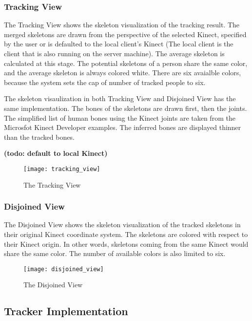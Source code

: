 \subsubsection{Tracking View}
\label{subsec:tracking_view}

The Tracking View shows the skeleton visualization of the tracking result. The merged skeletons are drawn from the perspective of the selected Kinect, specified by the user or is defaulted to the local client's Kinect (The local client is the client that is also running on the server machine). The average skeleton is calculated at this stage. The potential skeletons of a person share the same color, and the average skeleton is always colored white. There are six avaialble colors, because the system sets the cap of number of tracked people to six.

The skeleton visaulization in both Tracking View and Disjoined View has the same implementation. The bones of the skeletons are drawn first, then the joints. The simplified list of human bones using the Kinect joints are taken from the Microsfot Kinect Developer examples. The inferred bones are displayed thinner than the tracked bones.

\textbf{(todo: default to local Kinect)}

\begin{figure}[h!]
  \centering
  \texttt{[image: tracking\_view]}
  \caption{The Tracking View}
  \label{fig:tracking_view}
\end{figure}

\subsubsection{Disjoined View}
\label{subsec:disjoined_view}

The Disjoined View shows the skeleton visualization of the tracked skeletons in their original Kinect coordinate system. The skeletons are colored with respect to their Kinect origin. In other words, skeletons coming from the same Kinect would share the same color. The number of available colors is also limited to six.

\begin{figure}[h!]
  \centering
  \texttt{[image: disjoined\_view]}
  \caption{The Disjoined View}
  \label{fig:disjoined_view}
\end{figure}

\subsection{Tracker Implementation}

